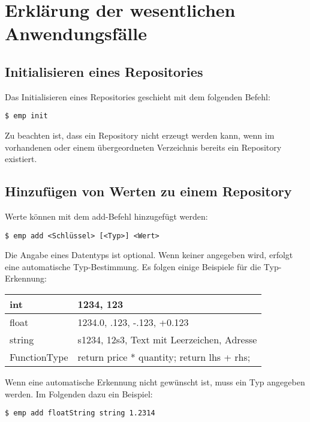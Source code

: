 

\section{Erklärung der wesentlichen Anwendungsfälle}

\subsection{Initialisieren eines Repositories}
Das Initialisieren eines Repositories geschieht mit dem folgenden Befehl:
\begin{lstlisting}[style=Bash]
$ emp init
\end{lstlisting}
Zu beachten ist, dass ein Repository nicht erzeugt werden kann, wenn im vorhandenen oder einem übergeordneten Verzeichnis bereits ein Repository existiert.

\subsection{Hinzufügen von Werten zu einem Repository}
Werte können mit dem add-Befehl hinzugefügt werden:
\begin{lstlisting}[style=Bash]
$ emp add <Schlüssel> [<Typ>] <Wert>
\end{lstlisting}
Die Angabe eines Datentyps ist optional. Wenn keiner angegeben wird, erfolgt eine automatische Typ-Bestimmung.
Es folgen einige Beispiele für die Typ-Erkennung:

\vspace{0.5em}

\begin{tabular}{| l | l |}
	\hline
	int & 1234, 123 \\
	\hline
	float & 1234.0, .123, -.123, +0.123 \\
	\hline
	string & s1234, 12s3, \grqq Text mit Leerzeichen\grqq , Adresse \\
	\hline
	FunctionType & \grqq return price * quantity; return lhs + rhs;\grqq\\
	\hline
\end{tabular}

\vspace{0.5em}

Wenn eine automatische Erkennung nicht gewünscht ist, muss ein Typ angegeben werden. Im Folgenden dazu ein Beispiel:
\begin{lstlisting}[style=Bash]
$ emp add floatString string 1.2314
\end{lstlisting}

